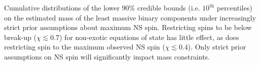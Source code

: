 \label{fig:restricted_priors} Cumulative distributions of the lower $90\%$ credible bounds (i.e. $10^\mathrm{th}$ percentiles) on the estimated mass of the least massive binary components under increasingly strict prior assumptions about maximum NS spin.  Restricting spins to be below break-up ($\chi\lesssim0.7$) for non-exotic equations of state has little effect, as does restricting spin to the maximum observed NS spin ($\chi\lesssim0.4$).  Only strict prior assumptions on NS spin will significantly impact mass constraints.
  
  
  